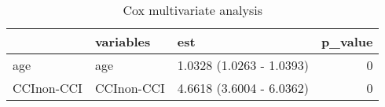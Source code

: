 \begin{table}

\caption{Cox multivariate analysis}
\centering
\begin{tabular}[t]{l|l|l|r}
\hline
  & variables & est & p\_value\\
\hline
age & age & 1.0328 (1.0263 - 1.0393) & 0\\
\hline
CCInon-CCI & CCInon-CCI & 4.6618 (3.6004 - 6.0362) & 0\\
\hline
\end{tabular}
\end{table}
